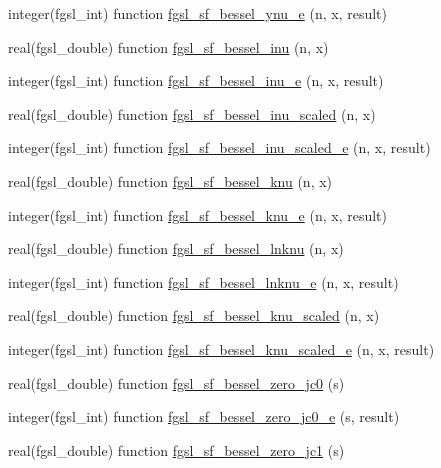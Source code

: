 \begin{DoxyCompactItemize}
integer(fgsl\-\_\-int) function \hyperlink{specfunc_8finc_aaa4e71884b289a2a52e6827a6eca9163}{fgsl\-\_\-sf\-\_\-bessel\-\_\-ynu\-\_\-e} (n, x, result)
\item 
real(fgsl\-\_\-double) function \hyperlink{specfunc_8finc_a1fed6ab1d4221c89be58f1e79a528230}{fgsl\-\_\-sf\-\_\-bessel\-\_\-inu} (n, x)
\item 
integer(fgsl\-\_\-int) function \hyperlink{specfunc_8finc_a8aa2ba9a048cc5ea1e075070a497ee72}{fgsl\-\_\-sf\-\_\-bessel\-\_\-inu\-\_\-e} (n, x, result)
\item 
real(fgsl\-\_\-double) function \hyperlink{specfunc_8finc_ac81f883430311e81a4c1014f558b5a2e}{fgsl\-\_\-sf\-\_\-bessel\-\_\-inu\-\_\-scaled} (n, x)
\item 
integer(fgsl\-\_\-int) function \hyperlink{specfunc_8finc_aff47bcb8483e57dc967dc3af2333337e}{fgsl\-\_\-sf\-\_\-bessel\-\_\-inu\-\_\-scaled\-\_\-e} (n, x, result)
\item 
real(fgsl\-\_\-double) function \hyperlink{specfunc_8finc_af4e2055bacde99b9ec42b58de6d9ccf1}{fgsl\-\_\-sf\-\_\-bessel\-\_\-knu} (n, x)
\item 
integer(fgsl\-\_\-int) function \hyperlink{specfunc_8finc_ad59eb26cf0d188829b69d2a0fbf62121}{fgsl\-\_\-sf\-\_\-bessel\-\_\-knu\-\_\-e} (n, x, result)
\item 
real(fgsl\-\_\-double) function \hyperlink{specfunc_8finc_ab96aff271057d2eec6c792a8e9b7139b}{fgsl\-\_\-sf\-\_\-bessel\-\_\-lnknu} (n, x)
\item 
integer(fgsl\-\_\-int) function \hyperlink{specfunc_8finc_aed7316a251f3d85c7984974a4bd7fd83}{fgsl\-\_\-sf\-\_\-bessel\-\_\-lnknu\-\_\-e} (n, x, result)
\item 
real(fgsl\-\_\-double) function \hyperlink{specfunc_8finc_a2abcdcc3f6a98141e4a3e7e825352f05}{fgsl\-\_\-sf\-\_\-bessel\-\_\-knu\-\_\-scaled} (n, x)
\item 
integer(fgsl\-\_\-int) function \hyperlink{specfunc_8finc_a2766197eb341e83dd19cd3906760f3f1}{fgsl\-\_\-sf\-\_\-bessel\-\_\-knu\-\_\-scaled\-\_\-e} (n, x, result)
\item 
real(fgsl\-\_\-double) function \hyperlink{specfunc_8finc_a04a84cf0899f959c847effbbc7097fdc}{fgsl\-\_\-sf\-\_\-bessel\-\_\-zero\-\_\-jc0} (s)
\item 
integer(fgsl\-\_\-int) function \hyperlink{specfunc_8finc_a037e54be265dc2efed30af169b68e7b4}{fgsl\-\_\-sf\-\_\-bessel\-\_\-zero\-\_\-jc0\-\_\-e} (s, result)
\item 
real(fgsl\-\_\-double) function \hyperlink{specfunc_8finc_aa0aae64cbda6d484991901f401cb31ce}{fgsl\-\_\-sf\-\_\-bessel\-\_\-zero\-\_\-jc1} (s)

\end{DoxyCompactItemize}
